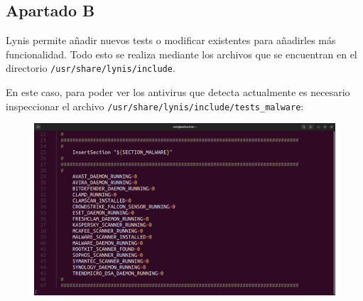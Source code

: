 \documentclass{article}
\begin{document}
%
%
%
%
%
%
%
%
%
%
%
%

\subsection*{Apartado B}
Lynis permite añadir nuevos tests o modificar existentes para añadirles más funcionalidad. Todo esto se realiza mediante los archivos que se encuentran en el directorio \verb|/usr/share/lynis/include|.

En este caso, para poder ver los antivirus que detecta actualmente es necesario inspeccionar el archivo \verb|/usr/share/lynis/include/tests_malware|:

\begin{figure}[H]
    \includegraphics[width=\textwidth]{imagenes/antivirus1.png}
\end{figure}
\end{document}
